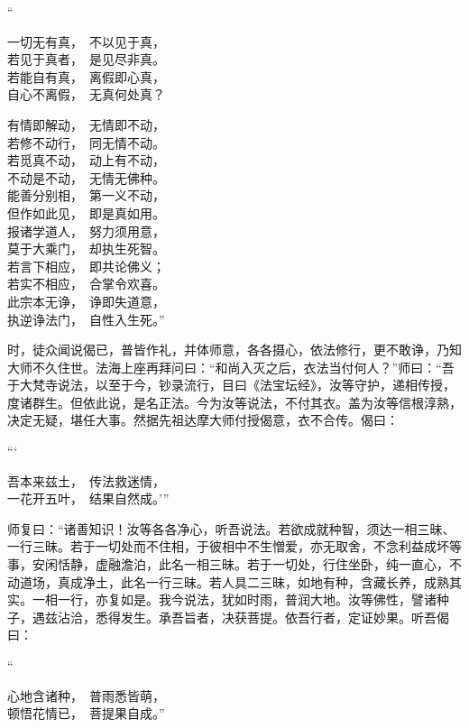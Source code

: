 \documentclass[UTF8, 11pt, oneside]{ctexart}
\newenvironment{jizi}[1]{
    \vspace{-1em}\begin{center}
        #1%
        \begin{varwidth}[t]{\linewidth}
}{
        \end{varwidth}
    \end{center}
}
\begin{document}
\begin{jizi}{“}
    一切无有真，　不以见于真， \\
    若见于真者，　是见尽非真。 \\
    若能自有真，　离假即心真， \\
    自心不离假，　无真何处真？ %
\end{jizi}
\begin{jizi}{}
    有情即解动，　无情即不动， \\
    若修不动行，　同无情不动。 \\
    若觅真不动，　动上有不动， \\
    不动是不动，　无情无佛种。 \\
    能善分别相，　第一义不动， \\
    但作如此见，　即是真如用。 \\
    报诸学道人，　努力须用意， \\
    莫于大乘门，　却执生死智。 \\
    若言下相应，　即共论佛义； \\
    若实不相应，　合掌令欢喜。 \\
    此宗本无诤，　诤即失道意， \\
    执逆诤法门，　自性入生死。”
\end{jizi}

时，徒众闻说偈已，普皆作礼，并体师意，各各摄心，依法修行，更不敢诤，乃知大师不久住世。法海上座再拜问曰：“和尚入灭之后，衣法当付何人？”师曰：“吾于大梵寺说法，以至于今，钞录流行，目曰《法宝坛经》，汝等守护，递相传授，度诸群生。但依此说，是名正法。今为汝等说法，不付其衣。盖为汝等信根淳熟，决定无疑，堪任大事。然据先祖达摩大师付授偈意，衣不合传。偈曰：

\begin{jizi}{“‘}
    吾本来兹土，　传法救迷情， \\
    一花开五叶，　结果自然成。’”
\end{jizi}

师复曰：“诸善知识！汝等各各净心，听吾说法。若欲成就种智，须达一相三昧、一行三昧。若于一切处而不住相，于彼相中不生憎爱，亦无取舍，不念利益成坏等事，安闲恬静，虚融澹泊，此名一相三昧。若于一切处，行住坐卧，纯一直心，不动道场，真成净土，此名一行三昧。若人具二三昧，如地有种，含藏长养，成熟其实。一相一行，亦复如是。我今说法，犹如时雨，普润大地。汝等佛性，譬诸种子，遇兹沾洽，悉得发生。承吾旨者，决获菩提。依吾行者，定证妙果。听吾偈曰：

\begin{jizi}{“}
    心地含诸种，　普雨悉皆萌， \\
    顿悟花情已，　菩提果自成。”
\end{jizi}
\end{document}
